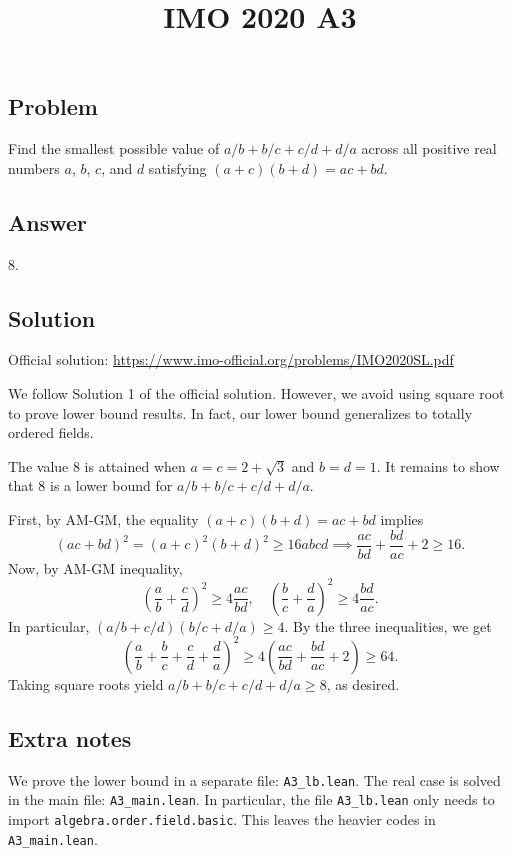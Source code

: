 \documentclass{article}
\title{IMO 2020 A3}
\author{}
\date{}
\begin{document}
\maketitle



\subsection*{Problem}

Find the smallest possible value of $a/b + b/c + c/d + d/a$ across all positive real numbers $a$, $b$, $c$, and $d$ satisfying $(a + c)(b + d) = ac + bd$.



\subsection*{Answer}

$8$.


\subsection*{Solution}

Official solution: \url{https://www.imo-official.org/problems/IMO2020SL.pdf}

We follow Solution 1 of the official solution.
However, we avoid using square root to prove lower bound results.
In fact, our lower bound generalizes to totally ordered fields.

The value $8$ is attained when $a = c = 2 + \sqrt{3}$ and $b = d = 1$.
It remains to show that $8$ is a lower bound for $a/b + b/c + c/d + d/a$.

First, by AM-GM, the equality $(a + c)(b + d) = ac + bd$ implies
\[ (ac + bd)^2 = (a + c)^2 (b + d)^2 \geq 16 abcd \implies \frac{ac}{bd} + \frac{bd}{ac} + 2 \geq 16. \]
Now, by AM-GM inequality,
\[ \left(\frac{a}{b} + \frac{c}{d}\right)^2 \geq 4\frac{ac}{bd}, \quad \left(\frac{b}{c} + \frac{d}{a}\right)^2 \geq 4\frac{bd}{ac}. \]
In particular, $(a/b + c/d)(b/c + d/a) \geq 4$.
By the three inequalities, we get
\[ \left(\frac{a}{b} + \frac{b}{c} + \frac{c}{d} + \frac{d}{a}\right)^2 \geq 4\left(\frac{ac}{bd} + \frac{bd}{ac} + 2\right) \geq 64. \]
Taking square roots yield $a/b + b/c + c/d + d/a \geq 8$, as desired.



\subsection*{Extra notes}

We prove the lower bound in a separate file: \texttt{A3\_lb.lean}.
The real case is solved in the main file: \texttt{A3\_main.lean}.
In particular, the file \texttt{A3\_lb.lean} only needs to import \texttt{algebra.order.field.basic}.
This leaves the heavier codes in \texttt{A3\_main.lean}.
\end{document}
